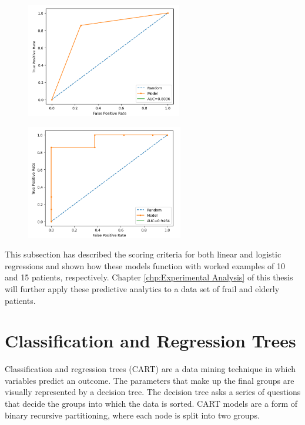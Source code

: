 \documentclass[../thesis.tex]{subfiles}
\begin{document}
\begin{figure}
\centering
\begin{minipage}{.5\textwidth}
  \centering
  \includegraphics[height = 5cm]{Chapters/Chapter3/Figures/ROCCurveExample.png}
  \label{fig:ROC1}
\end{minipage}%
\begin{minipage}{.5\textwidth}
  \centering
  \includegraphics[height = 5cm]{Chapters/Chapter3/Figures/ROCCurveExample1.png}
  \label{fig:ROC2}
\end{minipage}
\end{figure}


This subsection has described the scoring criteria for both linear and logistic regressions and shown how these models function with worked examples of 10 and 15 patients, respectively. Chapter \ref{chp:Experimental Analysis} of this thesis will further apply these predictive analytics to a data set of frail and elderly patients.


\section{Classification and Regression Trees}\label{sec:CART}
Classification and regression trees (CART) are a data mining technique in which variables predict an outcome. The parameters that make up the final groups are visually represented by a decision tree. The decision tree asks a series of questions that decide the groups into which the data is sorted. CART models are a form of binary recursive partitioning, where each node is split into two groups.
\end{document}
